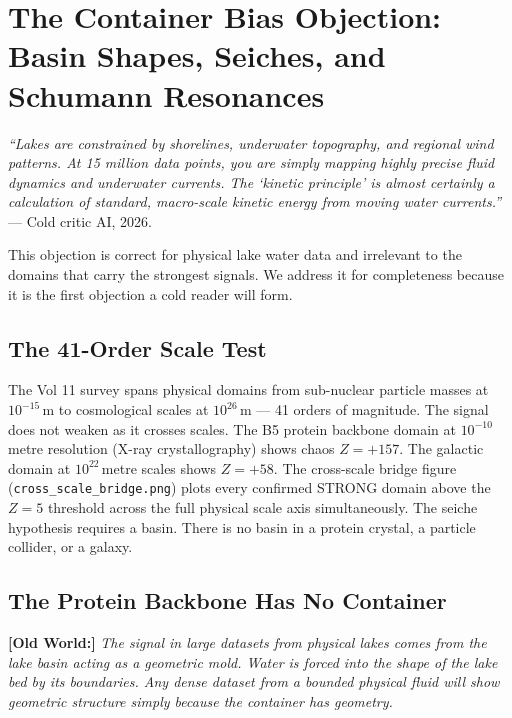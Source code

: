 \documentclass[11pt, letterpaper, openany]{book}
\newcommand{\oldworld}[1]{\noindent\textbf{\color{goldseal}[Old World:]}
  \textit{#1}\medskip}
\begin{document}
\chapter{The Container Bias Objection: Basin Shapes, Seiches, and Schumann Resonances}

\begin{objectionbox}
\textit{``Lakes are constrained by shorelines, underwater topography,
and regional wind patterns. At 15 million data points, you are simply
mapping highly precise fluid dynamics and underwater currents.
The `kinetic principle' is almost certainly a calculation of standard,
macro-scale kinetic energy from moving water currents.''} ---
Cold critic AI, 2026.
\end{objectionbox}

This objection is correct for physical lake water data and irrelevant
to the domains that carry the strongest signals. We address it for
completeness because it is the first objection a cold reader will form.

\section{The 41-Order Scale Test}
 
The Vol 11 survey spans physical domains from sub-nuclear particle
masses at $10^{-15}$\,m to cosmological scales at $10^{26}$\,m ---
41 orders of magnitude. The signal does not weaken as it crosses
scales. The B5 protein backbone domain at $10^{-10}$\,metre resolution
(X-ray crystallography) shows chaos $Z = +157$. The galactic domain at
$10^{22}$\,metre scales shows $Z = +58$. The cross-scale bridge figure
(\texttt{cross\_scale\_bridge.png}) plots every confirmed STRONG domain
above the $Z = 5$ threshold across the full physical scale axis
simultaneously. The seiche hypothesis requires a basin. There is
no basin in a protein crystal, a particle collider, or a galaxy.

\section{The Protein Backbone Has No Container}

\oldworld{The signal in large datasets from physical lakes comes from
the lake basin acting as a geometric mold. Water is forced into the
shape of the lake bed by its boundaries. Any dense dataset from a
bounded physical fluid will show geometric structure simply because
the container has geometry.}
\end{document}

